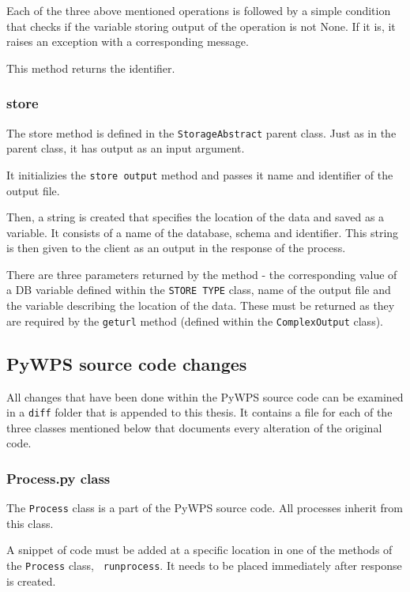 Each of the three above mentioned operations is followed by a simple
condition that checks if the variable storing output of the operation
is not None. If it is, it raises an exception with a corresponding
message.

This method returns the identifier.


\subsubsection{store} 

The store method is defined in the \texttt{StorageAbstract} parent
class. Just as in the parent class, it has output as an input
argument.

It initializies the \texttt{\textunderscore store\textunderscore
  output} method and passes it name and identifier of the output file.

Then, a string is created that specifies the location of the data and
saved as a variable. It consists of a name of the database, schema and
identifier. This string is then given to the client as an output in
the  response of the process.

There are three parameters returned by the method - the corresponding
value of a DB variable defined within the \texttt{STORE\textunderscore
  TYPE} class, name of the output file and the variable describing the
location of the data. These must be returned as they are required by
the \texttt{get\textunderscore url} method (defined within the
\texttt{ComplexOutput} class).


\subsection{PyWPS source code changes} 

All changes that have been done within the PyWPS source code can be
examined in a \texttt{diff} folder that is appended to this thesis. It
contains a file for each of the three classes mentioned below that
documents every alteration of the original code.

\subsubsection{Process.py class} 

The \texttt{Process} class is a part of the PyWPS source code. All
processes inherit from this class.

A snippet of code must be added at a specific location in one of the
methods of the \texttt{Process} class, \texttt{\textunderscore
  run\textunderscore process}. It needs to be placed immediately after
response is created.

